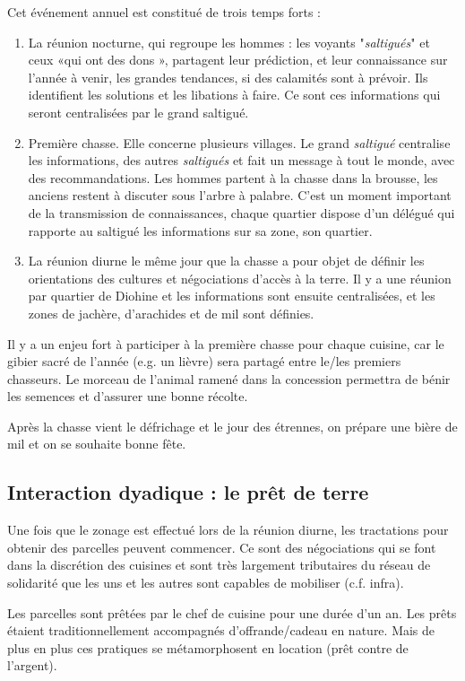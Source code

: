 Cet événement annuel est constitué de trois temps forts :
\begin{enumerate}
  \item La réunion nocturne, qui regroupe les hommes : les voyants "\textit{saltigués}" et ceux «qui ont des dons », partagent leur prédiction, et leur connaissance sur l'année à venir, les grandes tendances, si des calamités sont à prévoir. Ils identifient les solutions et les libations à faire. Ce sont ces informations qui seront centralisées par le grand saltigué.
  \item Première chasse. Elle concerne plusieurs villages.  Le grand \textit{saltigué} centralise les informations, des autres \textit{saltigués} et fait un message à tout le monde, avec des recommandations. Les hommes partent à la chasse dans la brousse, les anciens restent à discuter sous l'arbre à palabre. C'est un moment important de la transmission de connaissances, chaque quartier dispose d'un délégué qui rapporte au saltigué les informations sur sa zone, son quartier.
  \item La réunion diurne le même jour que la chasse a pour objet de définir les orientations des cultures et négociations d'accès à la terre. Il y a une réunion par quartier de Diohine et les informations sont ensuite centralisées, et les zones de jachère, d'arachides et de mil sont définies.
\end{enumerate}

Il y a un enjeu fort à participer à la première chasse pour chaque cuisine, car le gibier sacré de l'année (e.g. un lièvre) sera partagé entre le/les premiers chasseurs. Le morceau de l'animal ramené dans la concession permettra de bénir les semences et d'assurer une bonne récolte.

Après la chasse vient le défrichage et le jour des étrennes, on prépare une bière de mil et on se souhaite bonne fête.


\subsection{Interaction dyadique : le prêt de terre}

Une fois que le zonage est effectué lors de la réunion diurne, les tractations pour obtenir des parcelles peuvent commencer. Ce sont des négociations qui se font dans la discrétion des cuisines et sont très largement tributaires du réseau de solidarité que les uns et les autres sont capables de mobiliser (c.f. infra).

Les parcelles sont prêtées par le chef de cuisine pour une durée d'un an. Les prêts étaient traditionnellement accompagnés d'offrande/cadeau en nature. Mais de plus en plus ces pratiques se métamorphosent en location (prêt contre de l'argent).

